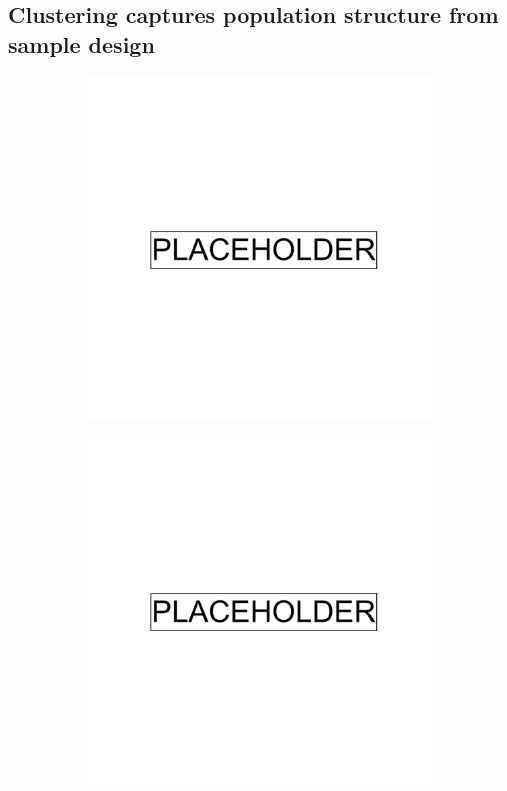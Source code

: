 \subsection{Clustering captures population structure from sample design}
\begin{figure}[!ht]
  \centering
  \begin{subfigure}[b]{0.45\linewidth}
\includegraphics[width=\linewidth]{placeholder.png}
    \caption{}
    \label{fig:1KGP_no_colours}
  \end{subfigure}
  \begin{subfigure}[b]{0.45\linewidth}
\includegraphics[width=\linewidth]{placeholder.png}

\end{subfigure}
\end{figure}
